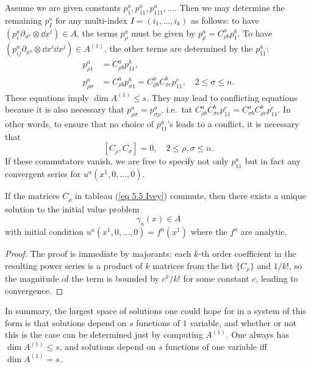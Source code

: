 \begin{example}
Assume we are given constants $p_1^a,p_{11}^a,p^a_{111},\ldots $. Then we may determine the remaining $p^a_I$ for any multi-index $I=(i_1,\ldots,i_k)$ as follows: to have $(p^a_i \partial_{u^a}\otimes \dd x^i)\in A$, the terms $p^a_\rho$ must be given by $p^a_\rho=C^a_{\rho b}p^b_1$. To have $(p^a_{ij}\partial_{u^a}\otimes \dd x^i\dd x^j)\in A^{(1)}$, the other terms are determined by the $p^a_{11}$:
\begin{align}
    p^a_{\rho 1}&=C^a_{\rho b}p^b_{11},\\
    p^a_{\rho\sigma}&=C^a_{\rho b}p^b_{\sigma 1}=C^a_{\rho b}C^b_{\sigma c}p^c_{11},\quad 2\leq \sigma\leq n.
\end{align}
These equations imply $\dim A^{(1)}\leq s$. They may lead to conflicting equations because it is also necessary that $p^a_{\rho\sigma}=p^a_{\sigma\rho}$, i.e.\ tat $C^a_{\rho b}C^b_{\sigma c}p^c_{11}=C^a_{\sigma b}C^b_{\rho c}p^c_{11}$. In other words, to ensure that no choice of $p^a_{11}$'s leads to a conflict, it is necessary that 
\[[C_\rho,C_\sigma]=0,\quad 2\leq \rho,\sigma\leq n.\]
If these commutators vanish, we are free to specify not only $p^a_{11}$ but in fact any convergent series for $u^a(x^1,0,\ldots,0)$.
\begin{prop}
    If the matrices $C_\rho$ in tableau (\ref{eq 5.5 Ivey}) commute, then there exists a unique solution to the initial value problem 
    \[\gamma_u(x)\in A\]
    with initial condition $u^a(x^1,0,\ldots,0)=f^a(x^1)$ where the $f^a$ are analytic.
\end{prop}
\begin{proof}
    The proof is immediate by majorants: each $k$-th order coefficient in the resulting power series is a product of $k$ matrices from the list $\{C_\rho\}$ and $1/k!$, so the magnitude of the term is bounded by $c^k/k!$ for some constant $c$, leading to convergence.
\end{proof}

In summary, the largest space of solutions one could hope for in a system of this form is that solutions depend on $s$ functions of $1$ variable, and whether or not this is the case can be determined just by computing $A^{(1)}$. One always has $\dim A^{(1)}\leq s$, and solutions depend on $s$ functions of one variable iff $\dim A^{(1)}=s$.
\end{example}

